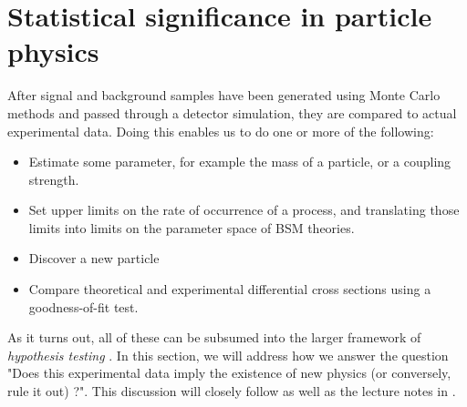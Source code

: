 \section{Statistical significance in particle physics}
After signal and background samples have been generated using Monte Carlo methods and passed through a detector simulation, they are compared to actual experimental data. Doing this enables us to do one or more of the following:
\begin{itemize}
  \item Estimate some parameter, for example the mass of a particle, or a coupling strength.
  \item Set upper limits on the rate of occurrence of a process, and translating those limits into limits on the parameter space of BSM theories.
  \item Discover a new particle
  \item Compare theoretical and experimental differential cross sections using a goodness-of-fit test.
\end{itemize}
As it turns out, all of these can be subsumed into the larger framework of \emph{hypothesis testing} \citep{Heinrich}. 
In this section, we will address how we answer the question "Does this experimental data imply the existence of new physics (or conversely, rule it out) ?". This discussion will closely follow as well as the lecture notes in \citep{Cranmer2015}. 

